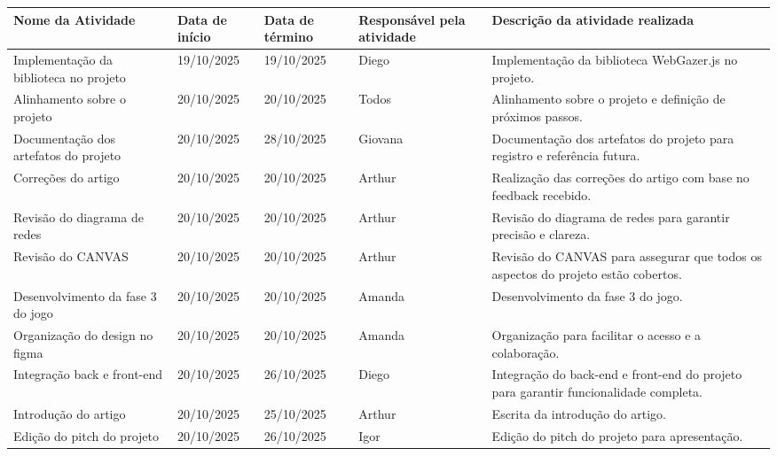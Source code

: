 \documentclass[
landscape,
  a4paper,%
  12pt,%
  english,%
  brazilian,%
]{article}
\begin{document}
\begin{table}[]
\begin{tabular}{|p{5cm}|l|l|l|p{8cm}|}
\end{tabular}
\end{table}

\break

 \begin{table}[]
\centering
\begin{tabular}{|p{5cm}|l|l|l|p{8cm}|}
\hline
Nome da Atividade & Data de início & Data de término & Responsável pela atividade & Descrição da atividade realizada \\ \hline
Implementação da biblioteca no projeto & 19/10/2025 & 19/10/2025 & Diego   & Implementação da biblioteca WebGazer.js no projeto. \\ \hline
Alinhamento sobre o projeto                        & 20/10/2025  & 20/10/2025 & Todos   & Alinhamento sobre o projeto e definição de próximos passos. \\ \hline
Documentação dos artefatos do projeto             & 20/10/2025  & 28/10/2025 & Giovana   & Documentação dos artefatos do projeto para registro e referência futura. \\ \hline
Correções do artigo                                & 20/10/2025  & 20/10/2025 & Arthur   & Realização das correções do artigo com base no feedback recebido. \\ \hline
Revisão do diagrama de redes                       & 20/10/2025  & 20/10/2025 & Arthur   & Revisão do diagrama de redes para garantir precisão e clareza. \\ \hline
Revisão do CANVAS                                 & 20/10/2025  & 20/10/2025 & Arthur   & Revisão do CANVAS para assegurar que todos os aspectos do projeto estão cobertos. \\ \hline
Desenvolvimento da fase 3 do jogo                 & 20/10/2025  & 20/10/2025 & Amanda   & Desenvolvimento da fase 3 do jogo. \\ \hline
Organização do design no figma                    & 20/10/2025  & 20/10/2025 & Amanda   & Organização para facilitar o acesso e a colaboração. \\ \hline
Integração back e front-end                       & 20/10/2025  & 26/10/2025 & Diego   & Integração do back-end e front-end do projeto para garantir funcionalidade completa. \\ \hline
Introdução do artigo                               & 20/10/2025 & 25/10/2025 & Arthur   & Escrita da introdução do artigo. \\ \hline
Edição do pitch do projeto                          & 20/10/2025 & 26/10/2025 & Igor   & Edição do pitch do projeto para apresentação. \\ \hline

\end{tabular}
\end{table}
\end{document}
